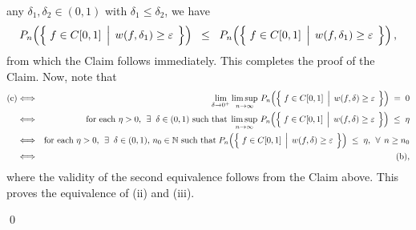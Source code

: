 any $\delta_{1}, \delta_{2} \in (0,1)$ with $\delta_{1} \leq \delta_{2}$, we have
\begin{equation*}
P_{n}\!\left(\left\{\;
	f \in \Czo
	\;\left\vert\;\,
	w(f,\delta_{1}) \overset{{\color{white}.}}{\geq} \varepsilon
	\right.
\;\right\}\right)
\;\;\leq\;\;
P_{n}\!\left(\left\{\;
	f \in \Czo
	\;\left\vert\;\,
	w(f,\delta_{1}) \overset{{\color{white}.}}{\geq} \varepsilon
	\right.
\;\right\}\right),
\end{equation*}
from which the Claim follows immediately.
This completes the proof of the Claim.
\vskip 0.3cm
\noindent
Now, note that
\begin{eqnarray*}
\textnormal{(c)}
&\Longleftrightarrow&
	\lim_{\delta\rightarrow 0^{+}}
	\limsup_{n\rightarrow\infty}\,
	P_{n}\!\left(\left\{\;
		f \in \Czo
		\;\left\vert\;\,
		w(f,\delta) \overset{{\color{white}.}}{\geq} \varepsilon
		\right.
	\;\right\}\right)
	\; = \; 0
\\
&\Longleftrightarrow&
	\textnormal{for each $\eta > 0$, \;$\exists$\;\;$\delta \in (0,1)$ such that}\;
	\limsup_{n\rightarrow\infty}\,
	P_{n}\!\left(\left\{\;
		f \in \Czo
		\;\left\vert\;\,
		w(f,\delta) \overset{{\color{white}.}}{\geq} \varepsilon
		\right.
	\;\right\}\right)
	\;\leq\; \eta
\\
&\Longleftrightarrow&
	\textnormal{for each $\eta > 0$, \;$\exists$\;\;$\delta \in (0,1)$, $n_{0}\in\N$ such that}\;
	P_{n}\!\left(\left\{\;
		f \in \Czo
		\;\left\vert\;\,
		w(f,\delta) \overset{{\color{white}.}}{\geq} \varepsilon
		\right.
	\;\right\}\right)
	\;\leq\; \eta,
	\;\,\forall\;\,n \geq n_{0}
\\
&\Longleftrightarrow& \textnormal{(b)},
\end{eqnarray*}
where the validity of the second equivalence follows from the Claim above.
This proves the equivalence of (ii) and (iii).

\qed

